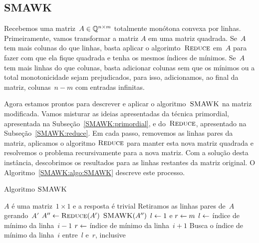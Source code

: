 
\subsection{SMAWK}
\newcommand{\SMAWK}{\textsc{SMAWK}}

Recebemos uma matriz~$A \in \mathbb{Q}^{n \times m}$ totalmente monótona convexa por linhas. Primeiramente, vamos transformar a matriz $A$ em uma matriz quadrada. Se~$A$ tem mais colunas do que linhas, basta aplicar o algorimto~$\textsc{Reduce}$ em~$A$ para fazer com que ela fique quadrada e tenha os mesmos índices de mínimos. Se~$A$ tem mais linhas do que colunas, basta adicionar colunas sem que os mínimos ou a total monotonicidade sejam prejudicados, para isso, adicionamos, ao final da matriz, colunas~$n-m$ com entradas infinitas. 

Agora estamos prontos para descrever e aplicar o algoritmo~$\SMAWK$ na matriz modificada. Vamos misturar as ideias apresentadas da técnica primordial, apresentada na Subseção~\ref{SMAWK:primordial}, e do~$\textsc{Reduce}$, apresentado na Subseção~\ref{SMAWK:reduce}. Em cada passo, removemos as linhas pares da matriz, aplicamos o algoritmo $\textsc{Reduce}$ para manter esta nova matriz quadrada e resolvemos o problema recursivamente para a nova matriz. Com a solução desta instância, descobrimos os resultados para as linhas restantes da matriz original. O Algoritmo~\ref{SMAWK:algo:SMAWK} descreve este processo.

\begin{algorithm}[H]
\caption{Algoritmo $\SMAWK$}
\label{SMAWK:algo:SMAWK}
\begin{algorithmic}[1]
\Function{\SMAWK}{A}
        \State $A$ é uma matriz~$1 \times 1$ e a resposta é trivial
    \Else
        \State Retiramos as linhas pares de~$A$ gerando~$A'$
        \State $A'' \leftarrow \textsc{Reduce}(A')$
        \State $\SMAWK(A'')$
            \State $l \leftarrow 1$ e $r \leftarrow m$
                \State $l \leftarrow$ índice de mínimo da linha~$i - 1$
            \EndIf
                \State $r \leftarrow$ índice de mínimo da linha~$i + 1$
            \EndIf
            \State Busca o índice de mínimo da linha~$i$ entre~$l$ e~$r$, inclusive
        \EndFor
    \EndIf
\EndFunction
\end{algorithmic}
\end{algorithm}

